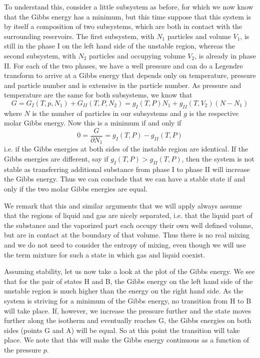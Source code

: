 \documentclass[a4paper, draft]{article}
\theoremstyle{own}
\theoremstyle{remark}
\begin{document}
To understand this, consider a little subsystem as before, for which we now know that the Gibbs energy has a minimum, but this time suppose that this system is by itself a composition of two subsystems, which are both in contact with the surrounding reservoirs. The first subsystem, with $N_1$ particles and volume $V_1$, is still in the phase I on the left hand side of the unstable region, whereas the second subsystem, with $N_2$ particles and occupying volume $V_2$, is already in phase II. For each of the two phases, we have a well pressure and can do a Legendre transform to arrive at a Gibbs energy that depends  only on temperature, pressure and particle number and is extensive in the particle number. As pressure and temperature are the same for both subsystems, we know that
$$
G = G_I(T, p, N_1)  + G_{II}(T, P, N_2) = g_I(T, P) N_1 + g_{II}(T, V_2) (N - N_1)
$$
where $N$ is the number of particles in our subsystems and $g$ is the respective molar Gibbs energy. Now this is a minimum if and only if
$$	
0 = \frac{G}{\partial N_1} = g_I(T, P) - g_{II}(T, P)
$$
i.e. if the Gibbs energies at both sides of the instable region are identical. If the Gibbs energies are different, say if $g_I(T, P) > g_{II}(T, P)$, then the system is not stable as transferring additional substance from phase I to phase II will increase the Gibbs energy. Thus we can conclude that we can have a stable state if and only if the two molar Gibbs energies are equal. 

We remark that this and similar arguments that we will apply always assume that the regions of liquid and gas are nicely separated, i.e. that the liquid part of the substance and the vaporized part each occupy their own well defined volume, but are in contact at the boundary of that volume. Thus there is no real mixing and we do not need to consider the entropy of mixing, even though we will use the term mixture for such a state in which gas and liquid coexist.

Assuming stability, let us now take a look at the plot of the Gibbs energy. We see that for the pair of states H and B, the Gibbs energy on the left hand side of the unstable region is much higher than the energy on the right hand side. As the system is striving for a minimum of the Gibbs energy, no transition from H to B will take place. If, however, we increase the pressure further and the state moves further along the isotherm and eventually reaches G, the Gibbs energies on both sides (points G and A) will be equal. So at this point the transition will take place. We note that this will make the Gibbs energy continuous as a function of the pressure $p$. 
\end{document}
